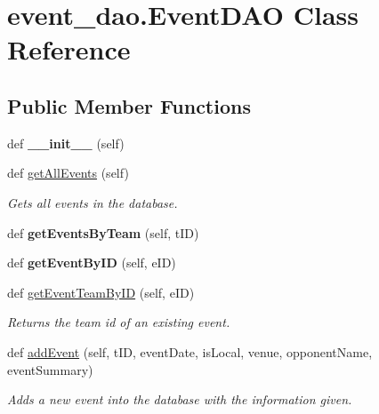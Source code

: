 \hypertarget{classevent__dao_1_1_event_d_a_o}{}\section{event\+\_\+dao.\+Event\+D\+AO Class Reference}
\label{classevent__dao_1_1_event_d_a_o}
\subsection*{Public Member Functions}
\begin{DoxyCompactItemize}
\item 
\mbox{\label{classevent__dao_1_1_event_d_a_o_a23990ec764310ae47c096aecfcc8f99c}} 
def {\bfseries \+\_\+\+\_\+init\+\_\+\+\_\+} (self)
\item 
def \hyperlink{classevent__dao_1_1_event_d_a_o_a743c378089d82f2dc09b3a5646b627f8}{get\+All\+Events} (self)
\begin{DoxyCompactList}\small\item\em Gets all events in the database. \end{DoxyCompactList}\item 
\mbox{\label{classevent__dao_1_1_event_d_a_o_a1af886e25e40359efec876299bb869b2}} 
def {\bfseries get\+Events\+By\+Team} (self, t\+ID)
\item 
\mbox{\label{classevent__dao_1_1_event_d_a_o_a0ff3dcce982d6dc573364d404be28f6d}} 
def {\bfseries get\+Event\+By\+ID} (self, e\+ID)
\item 
def \hyperlink{classevent__dao_1_1_event_d_a_o_ac05485b3c9b3be820aa3daea4b30aee7}{get\+Event\+Team\+By\+ID} (self, e\+ID)
\begin{DoxyCompactList}\small\item\em Returns the team id of an existing event. \end{DoxyCompactList}\item 
def \hyperlink{classevent__dao_1_1_event_d_a_o_a8c48a119d94d896c68fecb0d351a4ce3}{add\+Event} (self, t\+ID, event\+Date, is\+Local, venue, opponent\+Name, event\+Summary)
\begin{DoxyCompactList}\small\item\em Adds a new event into the database with the information given. \end{DoxyCompactList}\item 

\end{DoxyCompactItemize}

